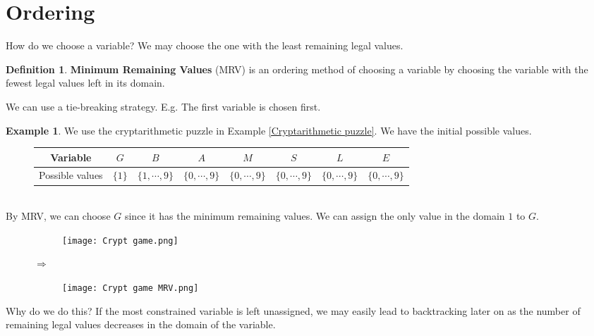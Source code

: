\documentclass{article}
\theoremstyle{definition}
\newtheorem{definition}{Definition}[section]
\newtheorem{example}{Example}[definition]
\begin{document}
\newpage
\section{Ordering}
How do we choose a variable? We may choose the one with the least remaining legal values.
\begin{definition}
	\textbf{Minimum Remaining Values} (MRV) is an ordering method of choosing a variable by choosing the variable with the fewest legal values left in its domain.
\end{definition}
 We can use a tie-breaking strategy. E.g. The first variable is chosen first.
\begin{example}
	\label{MRV}
	We use the cryptarithmetic puzzle in Example \ref{Cryptarithmetic puzzle}. We have the initial possible values.
	\begin{figure}[h!]
		\centering
		\begin{tabular}{|c||c|c|c|c|c|c|c|}
			\hline
			Variable & $G$ & $B$ & $A$ & $M$ & $S$ & $L$ & $E$\\
			\hline
			Possible values & $\{1\}$ & $\{1,\cdots,9\}$ & $\{0,\cdots,9\}$ & $\{0,\cdots,9\}$ & $\{0,\cdots,9\}$ & $\{0,\cdots,9\}$ & $\{0,\cdots,9\}$\\
			\hline
		\end{tabular}
	\end{figure}\\
	By MRV, we can choose $G$ since it has the minimum remaining values. We can assign the only value in the domain $1$ to $G$.
	\begin{figure}[h!]
		\centering
		\begin{subfigure}[h]{0.2\textwidth}
			\texttt{[image: Crypt game.png]}
		\end{subfigure}
		$\Longrightarrow$
		\begin{subfigure}[h]{0.2\textwidth}
			\texttt{[image: Crypt game MRV.png]}
		\end{subfigure}
	\end{figure}
\end{example}
Why do we do this? If the most constrained variable is left unassigned, we may easily lead to backtracking later on as the number of remaining legal values decreases in the domain of the variable.
\end{document}

